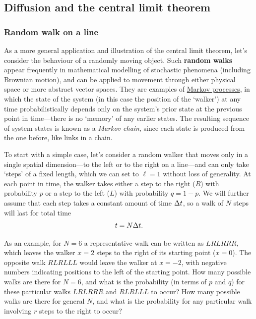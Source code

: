 \subsection{\label{sec:diffusion}Diffusion and the central limit theorem}
\subsubsection{Random walk on a line}
As a more general application and illustration of the central limit theorem, let's consider the behaviour of a randomly moving object.
Such \textbf{random walks} appear frequently in mathematical modelling of stochastic phenomena (including Brownian motion), and can be applied to movement through either physical space or more abstract vector spaces.
They are examples of \href{https://en.wikipedia.org/wiki/Markov_process}{Markov processes}, in which the state of the system (in this case the position of the `walker') at any time probabilistically depends only on the system's prior state at the previous point in time---there is no `memory' of any earlier states.
The resulting sequence of system states is known as a \textit{Markov chain}, since each state is produced from the one before, like links in a chain.

To start with a simple case, let's consider a random walker that moves only in a single spatial dimension---to the left or to the right on a line---and can only take `steps' of a fixed length, which we can set to $\ell = 1$ without loss of generality.
At each point in time, the walker takes either a step to the right ($R$) with probability $p$ or a step to the left ($L$) with probability $q = 1 - p$.
We will further assume that each step takes a constant amount of time $\Delta t$, so a walk of $N$ steps will last for total time
\begin{equation}
  \label{eq:RWtime}
  t = N \Delta t.
\end{equation}

\newpage %
As an example, for $N = 6$ a representative walk can be written as $LRLRRR$, which leaves the walker $x = 2$ steps to the right of its starting point ($x = 0$).
The opposite walk $RLRLLL$ would leave the walker at $x = -2$, with negative numbers indicating positions to the left of the starting point.
How many possible walks are there for $N = 6$, and what is the probability (in terms of $p$ and $q$) for these particular walks $LRLRRR$ and $RLRLLL$ to occur?
How many possible walks are there for general $N$, and what is the probability for any particular walk involving $r$ steps to the right to occur?
\begin{mdframed}
  \ \\[100 pt]
\end{mdframed}

